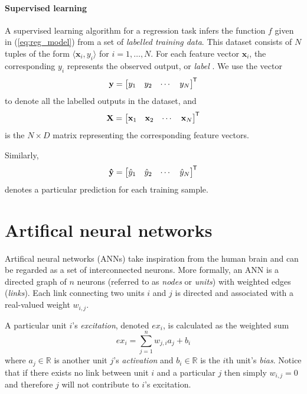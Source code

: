 \documentclass[oneside]{book}
\renewcommand\vec{\mathbf}
\newcommand*{\tran}{^{\mkern-1.5mu\mathsf{T}}}
\begin{document}
\paragraph{Supervised learning}
A supervised learning algorithm for a regression task infers the function $f$ given in (\ref{eq:reg_model}) from a set of \textit{labelled training data}. This dataset consists of $N$ tuples of the form $\langle \vec{x}_i, y_i\rangle$ for $i=1,\dots,N$.
For each feature vector $\vec{x}_i$, the corresponding $y_i$ represents the observed output, or \textit{label} \cite{burkov2019}.
We use the vector
\begin{equation}
    \vec{y} = \begin{bmatrix}
        y_1 & y_2 & \cdots & y_N
    \end{bmatrix}\tran
\end{equation}
to denote all the labelled outputs in the dataset, and
\begin{equation}
    \vec{X} = \begin{bmatrix}
        \vec{x}_1 & \vec{x}_2 & \cdots & \vec{x}_N
    \end{bmatrix}\tran
\end{equation}
is the $N \times D$ matrix representing the corresponding feature vectors.

Similarly,
\begin{equation}
    \label{eq:sup_learn_prediction}
    \vec{\hat{y}} = \begin{bmatrix}
        \hat{y}_1 & \hat{y}_2 & \cdots & \hat{y}_N
    \end{bmatrix}\tran
\end{equation}
denotes a particular prediction for each training sample.

\section{Artifical neural networks}
Artifical neural networks (ANNs) take inspiration from the human brain and can be regarded as a set of interconnected neurons. 
More formally, an ANN is a directed graph of $n$ neurons (referred to as \textit{nodes} or \textit{units}) with weighted edges (\textit{links}).
Each link connecting two units $i$ and $j$ is directed and associated with a real-valued weight $w_{i,j}$. 

A particular unit $i$'s \textit{excitation}, denoted ${ex}_i$, is calculated as the weighted sum
\begin{equation}
    {ex}_i = \sum_{j=1}^n{w_{j,i} a_j} + b_i
\end{equation}
where $a_j \in \mathbb{R}$ is another unit $j$'s \textit{activation} and $b_i \in \mathbb{R}$ is the $i$th unit's \textit{bias}.
Notice that if there exists no link between unit $i$ and a particular $j$ then simply $w_{i,j}=0$ and therefore $j$ will not contribute to $i$'s excitation. 
\end{document}

